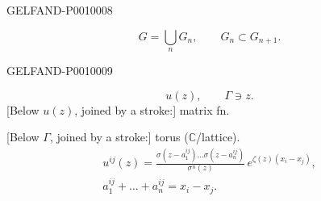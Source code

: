 \begin{GelfandAdjacentEvidence}{GELFAND-P001000}{8}

\[
G=\bigcup_n G_n,\qquad G_n\subset G_{n+1}.
\]
\end{GelfandAdjacentEvidence}
\begin{GelfandAdjacentEvidence}{GELFAND-P001000}{9}

\[
u(z),\qquad \Gamma\ni z.
\]
[Below $u(z)$, joined by a stroke:] matrix fn.
 
[Below $\Gamma$, joined by a stroke:] torus ($\mathbb C$/lattice).
\begin{gather*}
u^{ij}(z)=
\frac{\sigma(z-a_1^{ij})\ldots\sigma(z-a_n^{ij})}
{\sigma^n(z)}\,e^{\zeta(z)(x_i-x_j)},\\
a_1^{ij}+\ldots+a_n^{ij}=x_i-x_j.
\end{gather*}
\end{GelfandAdjacentEvidence}



\clearpage
{}
